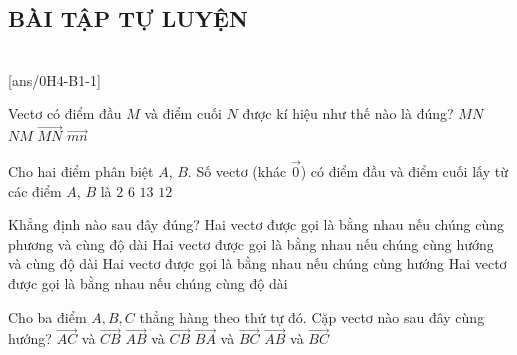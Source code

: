 \subsection{BÀI TẬP TỰ LUYỆN}
 \\
\setcounter{ex}{0}
[ans/0H4-B1-1]


\begin{ex}%
	Vectơ có điểm đầu $ M $ và điểm cuối $ N $ được kí hiệu như thế nào là đúng?
	\choice
	{$ MN $}
	{$ NM $}
	{\True $ \overrightarrow{MN} $}
	{$ \overrightarrow{mn}$}
\end{ex}

\begin{ex}%
	Cho hai điểm phân biệt $ A $, $ B $. Số vectơ (khác $ \overrightarrow{0} $) có điểm đầu và điểm cuối lấy từ các điểm $ A $, $ B $ là
	\choice
	{\True $ 2 $}
	{$ 6 $}
	{$ 13 $}
	{$ 12 $}
\end{ex}

\begin{ex}%
	Khẳng định nào sau đây đúng?
	\choice
	{Hai vectơ được gọi là bằng nhau nếu chúng cùng phương và cùng độ dài}
	{\True Hai vectơ được gọi là bằng nhau nếu chúng cùng hướng và cùng độ dài}
	{Hai vectơ được gọi là bằng nhau nếu chúng cùng hướng}
	{Hai vectơ được gọi là bằng nhau nếu chúng cùng độ dài}
\end{ex}

\begin{ex}%
	Cho ba điểm $A, B, C$ thẳng hàng theo thứ tự đó. Cặp vectơ nào sau đây cùng hướng?
	\choice
	{$\overrightarrow{AC}$ và $\overrightarrow{CB}$}
	{$\overrightarrow{AB}$ và $\overrightarrow{CB}$}
	{$\overrightarrow{BA}$ và $\overrightarrow{BC}$}
	{\True $\overrightarrow{AB}$ và $\overrightarrow{BC}$}
\end{ex}

